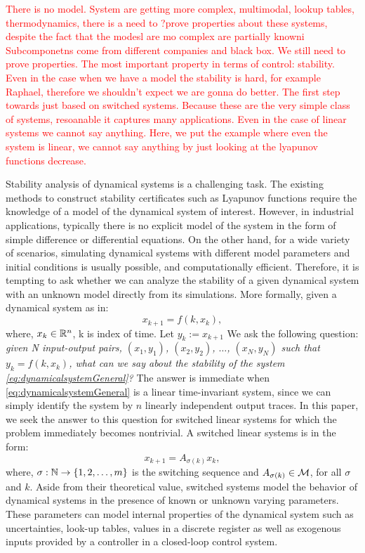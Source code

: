 \textcolor{red}{There is no model.
System are getting more complex, multimodal, lookup tables, thermodynamics, there is a need to ?prove properties about these systems, despite the fact that the modesl are mo complex are partially knowni Subcomponetns come from  different companies and black box.
We still need to prove properties.
The most important property in terms of control: stability.
Even in the case when we have a model the stability is hard, for example Raphael, therefore we shouldn't expect we are gonna do better. The first step towards just based on switched systems. Because these are the very simple class of systems, resoanable it captures many applications.
Even in the case of linear systems we cannot say anything. Here, we put the example where even the system is linear, we cannot say anything by just looking at the lyapunov functions decrease.}


Stability analysis of dynamical systems is a challenging task. The existing methods to construct stability certificates such as Lyapunov functions require the knowledge of a model of the dynamical system of interest. \cite{lyapunov} However, in industrial applications, typically there is no explicit model of the system in the form of simple difference or differential equations. On the other hand, for a wide variety of scenarios, simulating dynamical systems with different model parameters and initial conditions is usually possible, and computationally efficient. Therefore, it is tempting to ask whether we can analyze the stability of a given dynamical system with an unknown model directly from its simulations. More formally, given a dynamical system as in:
\begin{equation}\label{eq:dynamicalsystemGeneral}x_{k+1} = f(k, x_k),
\end{equation}
where, $x_k \in \mathbb{R}^n$, k is index of time. Let $y_k := x_{k+1}$
We ask the following question: \emph{
given N input-output pairs, $(x_1, y_1)$, $(x_2, y_2)$, $\ldots$, $(x_N, y_N)$ such that $y_{k} = f(k, x_k)$, what can we say about the stability of the system \eqref{eq:dynamicalsystemGeneral}?} The answer is immediate when \eqref{eq:dynamicalsystemGeneral} is a linear time-invariant system, since we can simply identify the system by $n$ linearly independent output traces. In this paper, we seek the answer to this question for switched linear systems for which the problem immediately becomes nontrivial. A switched linear systems is in the form:
\begin{equation}\label{eq:switchedSystem}x_{k+1} = A_{\sigma(k)}x_k,\end{equation}
where, $\sigma: \mathbb{N} \to \{1,2, \ldots, m\}$ is the switching sequence and $A_{\sigma(k)} \in \mathcal{M}$, for all $\sigma$ and $k$. Aside from their theoretical value, switched systems model the behavior of dynamical systems in the presence of known or unknown varying parameters. These parameters can model internal properties of the dynamical system such as uncertainties, look-up tables, values in a discrete register as well as exogenous inputs provided by a controller in a closed-loop control system. 

